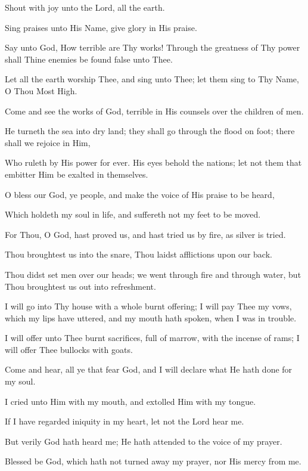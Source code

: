 Shout with joy unto the Lord, all the earth.

Sing praises unto His Name, give glory in His praise.

Say unto God, How terrible are Thy works! Through the greatness of Thy power shall Thine enemies be found false unto Thee.

Let all the earth worship Thee, and sing unto Thee; let them sing to Thy Name, O Thou Most High.

Come and see the works of God, terrible in His counsels over the children of men.

He turneth the sea into dry land; they shall go through the flood on foot; there shall we rejoice in Him,

Who ruleth by His power for ever. His eyes behold the nations; let not them that embitter Him be exalted in themselves.

O bless our God, ye people, and make the voice of His praise to be heard,

Which holdeth my soul in life, and suffereth not my feet to be moved.

For Thou, O God, hast proved us, and hast tried us by fire, as silver is tried.

Thou broughtest us into the snare, Thou laidst afflictions upon our back.

Thou didst set men over our heads; we went through fire and through water, but Thou broughtest us out into refreshment.

I will go into Thy house with a whole burnt offering; I will pay Thee my vows, which my lips have uttered, and my mouth hath spoken, when I was in trouble.

I will offer unto Thee burnt sacrifices, full of marrow, with the incense of rams; I will offer Thee bullocks with goats.

Come and hear, all ye that fear God, and I will declare what He hath done for my soul.

I cried unto Him with my mouth, and extolled Him with my tongue.

If I have regarded iniquity in my heart, let not the Lord hear me.

But verily God hath heard me; He hath attended to the voice of my prayer.

Blessed be God, which hath not turned away my prayer, nor His mercy from me.
